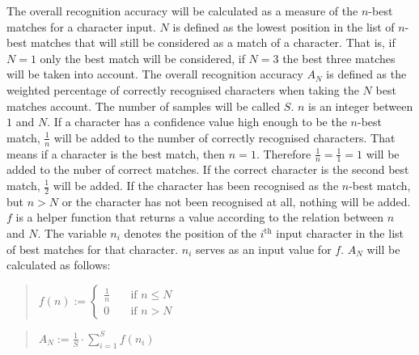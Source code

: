 The overall recognition accuracy will be calculated as a measure of
the \(n\)-best matches for a character input. \(N\) is defined as the
lowest position in the list of \(n\)-best matches that will still be considered 
as a match of a character. That is, if \(N = 1\) only the best match will 
be considered, if \(N = 3\) the best three matches will be taken into account.
The overall recognition accuracy \(A_{N}\) is defined as the weighted 
percentage of correctly recognised characters when taking the \(N\) best 
matches account. The number of samples will be called \(S\).
\(n\) is an integer between \(1\) and \(N\). If a character has a 
confidence value high enough to be the \(n\)-best match, \(\frac{1}{n}\) will
be added to the number of correctly recognised characters.
That means if a character is the best match, then \(n = 1\). 
Therefore \(\frac{1}{n} = \frac{1}{1} = 1\) will be added to the nuber of 
correct matches. If the correct character is the second best match, 
\(\frac{1}{2}\) will be added. If the character has been recognised as the 
\(n\)-best match, but \(n > N\) or the character has not been recognised at all,
nothing will be added. \(f\) is a helper function that returns a value
according to the relation between \(n\) and \(N\). The variable
\(n_{i}\) denotes the position of the \(i^{\text{th}}\) input character in
the list of best matches for that character. \(n_{i}\) serves as an input
value for \(f\). \(A_N\) will be calculated as follows:
\begin{quote}
  \(
    f(n):=
    \begin{cases}
      \frac{1}{n} & \quad \text{if $n \leq N$} \\
      0 & \quad \text{if $n > N$}
    \end{cases}
  \)
\end{quote}
\begin{quote}
  \(
    A_N := \frac{1}{S} \cdot \sum\limits_{i=1}^{S}{f(n_{i})}
  \)
\end{quote}








